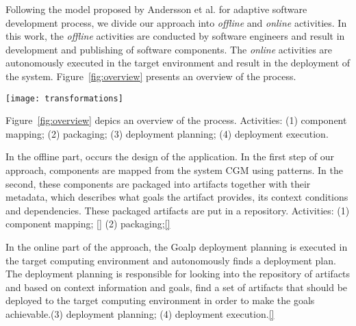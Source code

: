 \label{sec:proposal}



Following the model proposed by Andersson et al.\cite{andersson_software_2013} for adaptive software development process, we divide our approach into \emph{offline} and \emph{online} activities. In this work, the \emph{offline} activities are conducted by software engineers and result in development and publishing of software components. The \emph{online} activities are autonomously executed in the target environment and result in the deployment of the system. Figure~\ref{fig:overview} presents an overview of the process.

\begin{figure*}[!htb]
  \centering
  \texttt{[image: transformations]}
  \caption{Overview}
\label{fig:overview}
\end{figure*}

Figure~\ref{fig:overview} depics an overview of the process.
Activities: (1) component mapping; (2) packaging;
(3) deployment planning; (4) deployment execution.

In the offline part, occurs the design of the application. In the first step of our approach, components are mapped from the system CGM using patterns. In the second, these components are packaged into artifacts together with their metadata, which describes what goals the artifact provides, its context conditions and dependencies. These packaged artifacts are put in a repository.  Activities: (1) component mapping; \ref{} (2) packaging;\ref{}

In the online part of the approach, the Goalp deployment planning is executed in the target computing environment and autonomously finds a deployment plan.
The deployment planning is responsible for looking into the repository of artifacts and based on context information and goals, find a set of artifacts that should be deployed to the target computing environment in order to make the goals achievable.(3) deployment planning; (4) deployment execution.\ref{}



